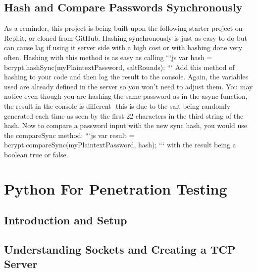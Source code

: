 \documentclass{article}%
\begin{document}
%
\subsection{Hash and Compare Passwords Synchronously}%
\label{subsec:HashandComparePasswordsSynchronously}%
As a reminder, this project is being built upon the following starter project on Repl.it, or cloned from GitHub.\newline%
Hashing synchronously is just as easy to do but can cause lag if using it server side with a high cost or with hashing done very often. Hashing with this method is as easy as calling \newline%
```js\newline%
var hash = bcrypt.hashSync(myPlaintextPassword, saltRounds);\newline%
```\newline%
Add this method of hashing to your code and then log the result to the console. Again, the variables used are already defined in the server so you won't need to adjust them. You may notice even though you are hashing the same password as in the async function, the result in the console is different{-} this is due to the salt being randomly generated each time as seen by the first 22 characters in the third string of the hash.\newline%
Now to compare a password input with the new sync hash, you would use the compareSync method: \newline%
```js\newline%
var result = bcrypt.compareSync(myPlaintextPassword, hash);\newline%
```\newline%
with the result being a boolean true or false.\newline%

%
\newpage%
\section{Python For Penetration Testing}%
\label{sec:PythonForPenetrationTesting}%
\subsection{Introduction and Setup}%
\label{subsec:IntroductionandSetup}%

%
\subsection{Understanding Sockets and Creating a TCP Server}%
\label{subsec:UnderstandingSocketsandCreatingaTCPServer}%
\end{document}
